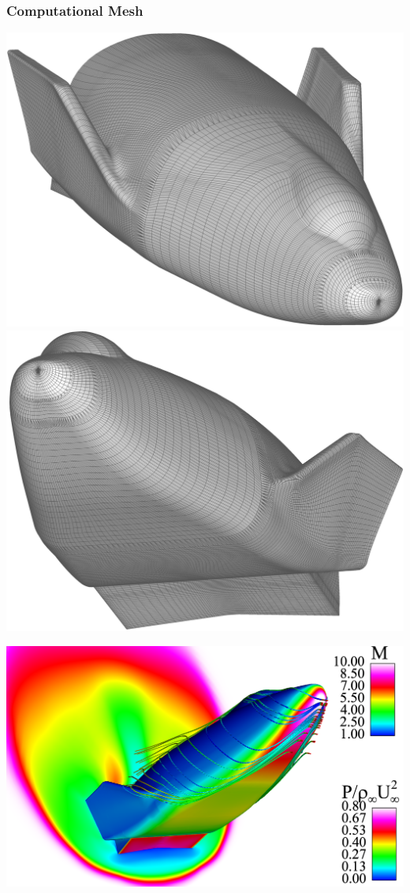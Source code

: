 \documentclass[compress,11pt]{beamer}
\begin{document}
\frame
{
  \frametitle{\scriptsize Computational Mesh}
  \begin{center}
    \includegraphics[width=.45\textwidth]{figures/x38/x38-top}
    \includegraphics[width=.45\textwidth]{figures/x38/x38-bottom}
  \end{center}
}

\frame
{
  \begin{center}
    \includegraphics[width=.95\textwidth]{figures/x38/x38-pressure-mach-clip}
  \end{center}
}
\end{document}
